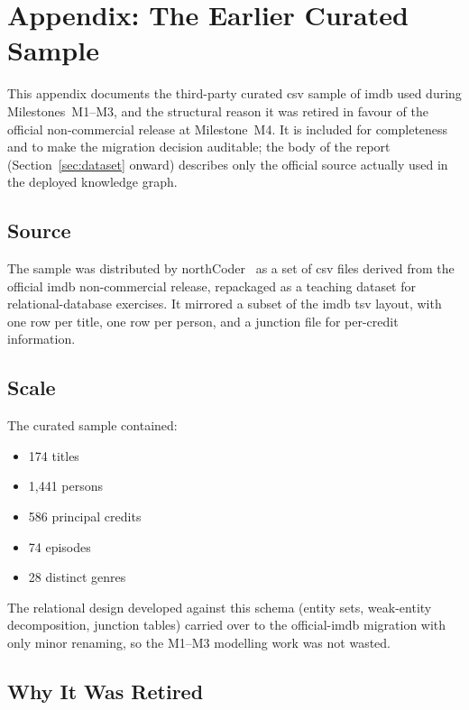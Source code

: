 \section{Appendix: The Earlier Curated Sample}
\label{app:old-dataset}

This appendix documents the third-party curated \ac{csv} sample of \ac{imdb} used during Milestones~M1--M3, and the structural reason it was retired in favour of the official non-commercial release at Milestone~M4. It is included for completeness and to make the migration decision auditable; the body of the report (Section~\ref{sec:dataset} onward) describes only the official source actually used in the deployed knowledge graph.

\subsection*{Source}

The sample was distributed by northCoder~\cite{northcoder-blog,northcoder-repo} as a set of \ac{csv} files derived from the official \ac{imdb} non-commercial release, repackaged as a teaching dataset for relational-database exercises. It mirrored a subset of the \ac{imdb} \ac{tsv} layout, with one row per title, one row per person, and a junction file for per-credit information.

\subsection*{Scale}

The curated sample contained:
\begin{itemize}
    \item 174 titles
    \item 1{,}441 persons
    \item 586 principal credits
    \item 74 episodes
    \item 28 distinct genres
\end{itemize}

\noindent The relational design developed against this schema (entity sets, weak-entity decomposition, junction tables) carried over to the official-\ac{imdb} migration with only minor renaming, so the M1--M3 modelling work was not wasted.

\subsection*{Why It Was Retired}

